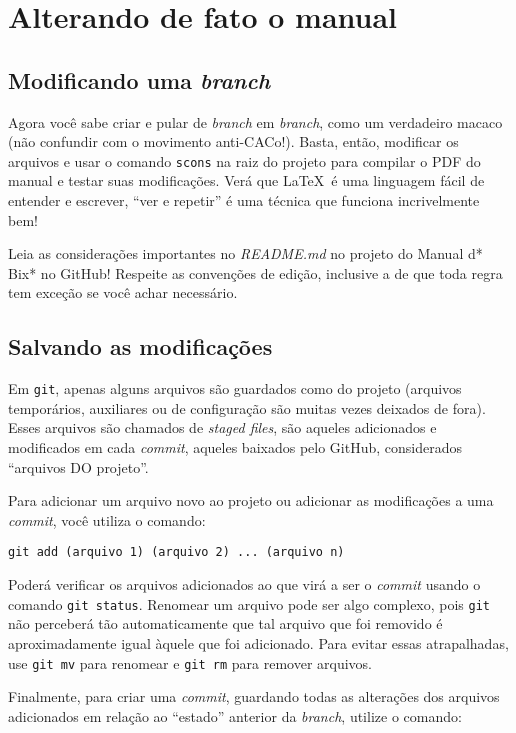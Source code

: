 \documentclass[a4paper,oneside,10pt]{memoir}
\begin{document}
\section{Alterando de fato o manual}

\subsection{Modificando uma \emph{branch}}

Agora você sabe criar e pular de \emph{branch} em \emph{branch}, como um
verdadeiro macaco (não confundir com o movimento anti-CACo!). Basta, então,
modificar os arquivos e usar o comando \texttt{scons} na raiz do projeto para
compilar o PDF do manual e testar suas modificações. Verá que \LaTeX\, é uma
linguagem fácil de entender e escrever, ``ver e repetir'' é uma técnica que
funciona incrivelmente bem!

Leia as considerações importantes no \emph{README.md} no projeto do Manual d*
Bix* no GitHub! Respeite as convenções de edição, inclusive a de que toda regra
tem exceção se você achar necessário.

\subsection{Salvando as modificações}

Em \texttt{git}, apenas alguns arquivos são guardados como do projeto (arquivos
temporários, auxiliares ou de configuração são muitas vezes deixados de fora).
Esses arquivos são chamados de \emph{staged files}, são aqueles adicionados e
modificados em cada \emph{commit}, aqueles baixados pelo GitHub, considerados
``arquivos DO projeto''.

Para adicionar um arquivo novo ao projeto ou adicionar as modificações a uma
\emph{commit}, você utiliza o comando:

\begin{center}
\texttt{git add (arquivo 1) (arquivo 2) ... (arquivo n)}
\end{center}

Poderá verificar os arquivos adicionados ao que virá a ser o \emph{commit}
usando o comando \texttt{git status}. Renomear um arquivo pode ser algo
complexo, pois \texttt{git} não perceberá tão automaticamente que tal arquivo
que foi removido é aproximadamente igual àquele que foi adicionado. Para evitar
essas atrapalhadas, use \texttt{git mv} para renomear e \texttt{git rm} para
remover arquivos.

Finalmente, para criar uma \emph{commit}, guardando todas as alterações dos
arquivos adicionados em relação ao ``estado'' anterior da \emph{branch},
utilize o comando:
\end{document}

